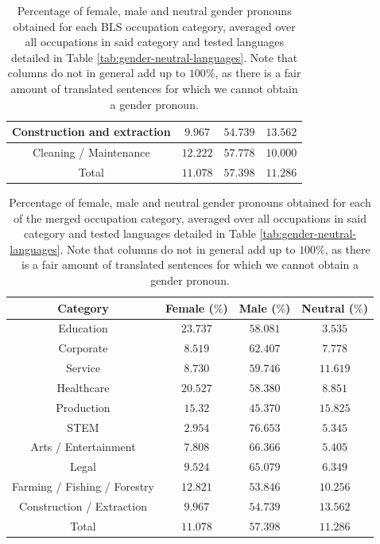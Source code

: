 \documentclass[fleqn,10pt]{article}
\begin{document}
\begin{table}[H]
{\begin{tabular}{|c|c|c|c|}
	Construction and extraction				& $9.967$		& $54.739$		& $13.562$		\\ \hline
	Cleaning / Maintenance					& $12.222$		& $57.778$		& $10.000$		\\ \hline
	\hline
	Total           						& $11.078$ 		& $57.398$ 		& $11.286$ 		\\ \hline
	\end{tabular}
	}
    \caption{Percentage of female, male and neutral gender pronouns obtained for each BLS occupation category, averaged over all occupations in said category and tested languages detailed in Table \ref{tab:gender-neutral-languages}. Note that columns do not in general add up to $100\%$, as there is a fair amount of translated sentences for which we cannot obtain a gender pronoun.}
	\label{tab:gender-by-category}
\end{table}

\begin{table}[H]
\centering
\small{
	\begin{tabular}{|c|c|c|c|}
	\hline
	Category 								& Female ($\%$)			& Male ($\%$)			& Neutral ($\%$)	\\ \hline
	\hline
	Education								& $23.737$				& $58.081$				& $3.535$			\\ \hline
	Corporate								& $8.519$				& $62.407$				& $7.778$			\\ \hline
	Service									& $8.730$				& $59.746$				& $11.619$			\\ \hline
	Healthcare								& $20.527$				& $58.380$				& $8.851$			\\ \hline
	Production								& $15.32$				& $45.370$				& $15.825$			\\ \hline
	STEM									& $2.954$				& $76.653$				& $5.345$			\\ \hline
	Arts / Entertainment					& $7.808$				& $66.366$				& $5.405$			\\ \hline
	Legal									& $9.524$				& $65.079$				& $6.349$			\\ \hline
	Farming / Fishing / Forestry			& $12.821$				& $53.846$				& $10.256$			\\ \hline
	Construction / Extraction				& $9.967$				& $54.739$				& $13.562$			\\ \hline
	\hline
	Total           						& $11.078$ 				& $57.398$ 				& $11.286$ 			\\ \hline
	\end{tabular}
	}
    \caption{Percentage of female, male and neutral gender pronouns obtained for each of the merged occupation category, averaged over all occupations in said category and tested languages detailed in Table \ref{tab:gender-neutral-languages}. Note that columns do not in general add up to $100\%$, as there is a fair amount of translated sentences for which we cannot obtain a gender pronoun.}
	\label{tab:gender-by-category-grouped}
\end{table}
\end{document}
